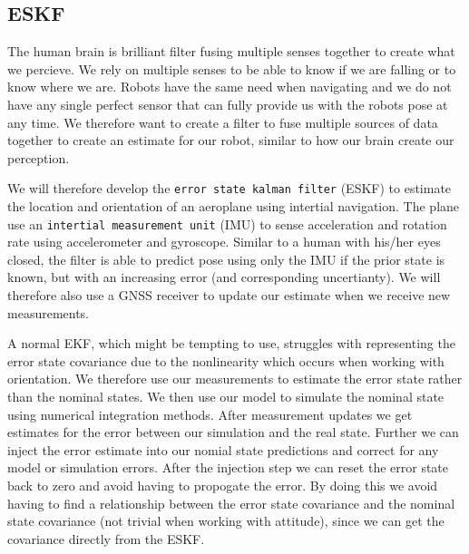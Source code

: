 \subsection{ESKF}
The human brain is brilliant filter fusing multiple senses together to create what we percieve. We rely on multiple senses to be able to know if we are falling or to know where we are. 
Robots have the same need when navigating and we do not have any single perfect sensor that can fully provide us with the robots pose at any time. We therefore want to create a filter to fuse multiple sources of data together to create an estimate for our robot, similar to how our brain create our perception.

We will therefore develop the \texttt{error state kalman filter} (ESKF) to estimate the location and orientation of an aeroplane using intertial navigation. The plane use an \texttt{intertial measurement unit} (IMU) to sense acceleration and rotation rate using accelerometer and gyroscope. Similar to a human with his/her eyes closed, the filter is able to predict pose using only the IMU if the prior state is known, but with an increasing error (and corresponding uncertianty). We will therefore also use a GNSS receiver to update our estimate when we receive new measurements. 

A normal EKF, which might be tempting to use, struggles with representing the error state covariance due to the nonlinearity which occurs when working with orientation. We therefore use our measurements to estimate the error state rather than the nominal states. We then use our model to simulate the nominal state using numerical integration methods. After measurement updates we get estimates for the error between our simulation and the real state. Further we can inject the error estimate into our nomial state predictions and correct for any model or simulation errors. After the injection step we can reset the error state back to zero and avoid having to propogate the error. By doing this we avoid having to find a relationship between the error state covariance and the nominal state covariance (not trivial when working with attitude), since we can get the covariance directly from the ESKF. 